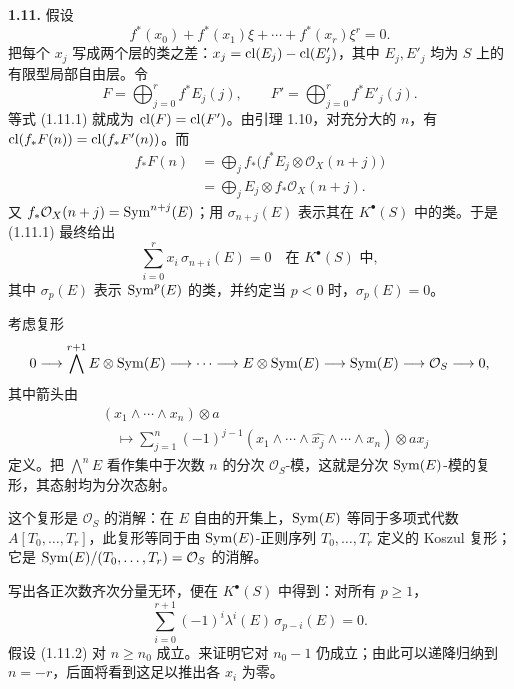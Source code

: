 \noindent\textbf{1.11.} 假设
\begin{equation}\tag{1.11.1}
  f^*(x_0)+f^*(x_1)\xi+\cdots+f^*(x_r)\xi^r=0 .
\end{equation}
把每个 \(x_j\) 写成两个层的类之差：\(x_j=\operatorname{cl}(E_j)-\operatorname{cl}(E'_j)\)，其中 \(E_j,E'_j\) 均为 \(S\) 上的有限型局部自由层。令
\[
 F=\bigoplus_{j=0}^r f^*E_j(j),\qquad
 F'=\bigoplus_{j=0}^r f^*E'_j(j).
\]
等式 (1.11.1) 就成为 \(\operatorname{cl}(F)=\operatorname{cl}(F')\)。由引理 1.10，对充分大的 \(n\)，有 \(\operatorname{cl}(f_*F(n))=\operatorname{cl}(f_*F'(n))\)。而
\[
\begin{aligned}
 f_*F(n)&=\bigoplus_j f_*\bigl(f^*E_j\otimes\mathcal O_X(n+j)\bigr)\\
        &=\bigoplus_j E_j\otimes f_*\mathcal O_X(n+j).
\end{aligned}
\]
又 \(f_*\mathcal O_X(n+j)=\operatorname{Sym}^{n+j}(E)\)；用 \(\sigma_{n+j}(E)\) 表示其在 \(K^\bullet(S)\) 中的类。于是 (1.11.1) 最终给出
\begin{equation}\tag{1.11.2}
  \sum_{i=0}^{r} x_i\,\sigma_{n+i}(E)=0
  \quad\text{在 }K^\bullet(S)\text{ 中},
\end{equation}
其中 \(\sigma_p(E)\) 表示 \(\operatorname{Sym}^p(E)\) 的类，并约定当 \(p<0\) 时，\(\sigma_p(E)=0\)。

考虑复形
\[
\begin{aligned}
 0\longrightarrow\bigwedge^{r+1}E\otimes\operatorname{Sym}(E)
 \longrightarrow\cdots\longrightarrow E\otimes\operatorname{Sym}(E)
 \longrightarrow\operatorname{Sym}(E)\longrightarrow\mathcal O_S\longrightarrow0,
\end{aligned}
\]
其中箭头由
\[
\begin{aligned}
 &(x_1\wedge\cdots\wedge x_n)\otimes a\\
 &\quad\longmapsto\sum_{j=1}^n(-1)^{j-1}
 (x_1\wedge\cdots\wedge\widehat{x_j}\wedge\cdots\wedge x_n)\otimes ax_j
\end{aligned}
\]
定义。把 \(\bigwedge^n E\) 看作集中于次数 \(n\) 的分次 \(\mathcal O_S\)-模，这就是分次 \(\operatorname{Sym}(E)\)-模的复形，其态射均为分次态射。

这个复形是 \(\mathcal O_S\) 的消解：在 \(E\) 自由的开集上，\(\operatorname{Sym}(E)\) 等同于多项式代数 \(A[T_0,\ldots,T_r]\)，此复形等同于由 \(\operatorname{Sym}(E)\)-正则序列 \(T_0,\ldots,T_r\) 定义的 Koszul 复形；它是 \(\operatorname{Sym}(E)/(T_0,\ldots,T_r)=\mathcal O_S\) 的消解。

写出各正次数齐次分量无环，便在 \(K^\bullet(S)\) 中得到：对所有 \(p\geq1\)，
\begin{equation}\tag{1.11.3}
  \sum_{i=0}^{r+1}(-1)^i\lambda^i(E)\,\sigma_{p-i}(E)=0 .
\end{equation}
假设 (1.11.2) 对 \(n\geq n_0\) 成立。来证明它对 \(n_0-1\) 仍成立；由此可以递降归纳到 \(n=-r\)，后面将看到这足以推出各 \(x_i\) 为零。

